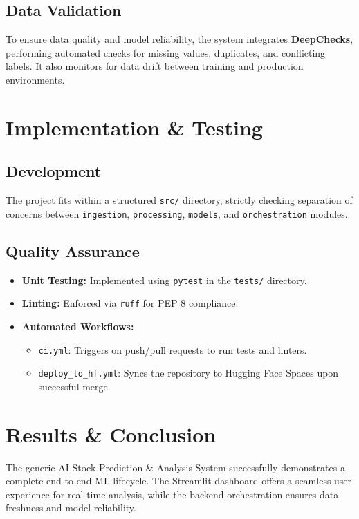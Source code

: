 \documentclass[conference]{IEEEtran}
\begin{document}
\subsection{Data Validation}
To ensure data quality and model reliability, the system integrates \textbf{DeepChecks}, performing automated checks for missing values, duplicates, and conflicting labels. It also monitors for data drift between training and production environments.

\section{Implementation \& Testing}

\subsection{Development}
The project fits within a structured \texttt{src/} directory, strictly checking separation of concerns between \texttt{ingestion}, \texttt{processing}, \texttt{models}, and \texttt{orchestration} modules.

\subsection{Quality Assurance}
\begin{itemize}
    \item \textbf{Unit Testing:} Implemented using \texttt{pytest} in the \texttt{tests/} directory.
    \item \textbf{Linting:} Enforced via \texttt{ruff} for PEP 8 compliance.
    \item \textbf{Automated Workflows:}
    \begin{itemize}
        \item \texttt{ci.yml}: Triggers on push/pull requests to run tests and linters.
        \item \texttt{deploy\_to\_hf.yml}: Syncs the repository to Hugging Face Spaces upon successful merge.
    \end{itemize}
\end{itemize}

\section{Results \& Conclusion}
The generic AI Stock Prediction \& Analysis System successfully demonstrates a complete end-to-end ML lifecycle. The Streamlit dashboard offers a seamless user experience for real-time analysis, while the backend orchestration ensures data freshness and model reliability.
\end{document}
